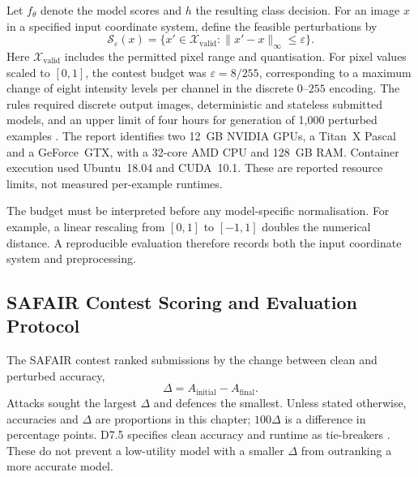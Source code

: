 Let $f_\theta$ denote the model scores and $h$ the resulting class decision. For an image $x$
in a specified input coordinate system, define the feasible perturbations by
\begin{equation}
  \mathcal S_\varepsilon(x)
  =\{x'\in\mathcal X_{\mathrm{valid}}:\|x'-x\|_\infty\leq\varepsilon\}.
  \label{eq:advml:feasible}
\end{equation}
Here $\mathcal X_{\mathrm{valid}}$ includes the permitted pixel range and quantisation.
For pixel values scaled to $[0,1]$, the contest budget was $\varepsilon=8/255$, corresponding
to a maximum change of eight intensity levels per channel in the discrete $0$--$255$ encoding.
The rules required discrete output images, deterministic and stateless submitted models, and
an upper limit of four hours for generation of 1,000 perturbed examples
\cite{sparta2022d76}. The report identifies two 12~GB NVIDIA GPUs, a Titan~X Pascal and a
GeForce~GTX, with a 32-core AMD CPU and 128~GB RAM. Container execution used Ubuntu~18.04
and CUDA~10.1. These are reported resource limits, not measured per-example runtimes.

The budget must be interpreted before any model-specific normalisation. For example, a linear
rescaling from $[0,1]$ to $[-1,1]$ doubles the numerical distance. A reproducible evaluation
therefore records both the input coordinate system and preprocessing.

\subsection{SAFAIR Contest Scoring and Evaluation Protocol}

The SAFAIR contest ranked submissions by the change between clean and perturbed accuracy,
\begin{equation}
  \Delta=A_{\mathrm{initial}}-A_{\mathrm{final}}.
  \label{eq:advml:delta}
\end{equation}
Attacks sought the largest $\Delta$ and defences the smallest. Unless stated otherwise,
accuracies and $\Delta$ are proportions in this chapter; $100\Delta$ is a difference in
percentage points. D7.5 specifies clean accuracy and runtime as tie-breakers
\cite{sparta2021d75}. These do not prevent a low-utility model with a smaller $\Delta$ from
outranking a more accurate model.

